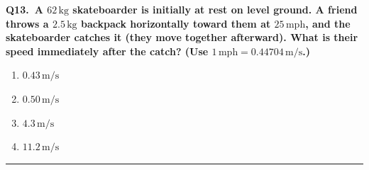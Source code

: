 \documentclass[11pt]{article}
\newcommand{\QuestionStyle}[1]{{\large\bfseries\boldmath #1}}
\newcommand{\AnswerStyle}[1]{{\large\bfseries\boldmath #1}}
\newcommand{\ReasonStyle}[1]{{\normalsize #1}}
\newif\ifshowreason
\newcommand{\Correct}[2]{%
  \item \AnswerStyle{\textcolor{AnsRed}{#1}}%
  \ifshowreason\\[-0.2em]
    \ReasonStyle{\textcolor{AnsRed}{#2}}%
  \fi
}
\newcommand{\Wrong}[2]{%
  \item \AnswerStyle{\textcolor{WrongBlue}{#1}}%
  \ifshowreason\\[-0.2em]
    \ReasonStyle{\textcolor{WrongBlue}{#2}}%
  \fi
}
\newcommand{\QBlock}[3]{%
  \Needspace{8\baselineskip}%
  \noindent
  \begin{minipage}{\linewidth}
    \QuestionStyle{#1.~#2}

    \vspace{0.25em}
    \begin{enumerate}
      #3
    \end{enumerate}

    \vspace{0.25em}
    \hrule height 0.4pt
  \end{minipage}
  \vspace{0.75em}
}
\begin{document}
\QBlock{Q13}{A $62\,\text{kg}$ skateboarder is initially at rest on level ground. A friend throws a $2.5\,\text{kg}$ backpack horizontally toward them at $25\,\text{mph}$, and the skateboarder catches it (they move together afterward). What is their speed immediately after the catch? (Use $1\,\text{mph}=0.44704\,\text{m/s}$.)}{
  \Correct{$0.43\,\text{m/s}$}{Treat the catch as a perfectly inelastic collision and conserve momentum: $m_b v_b = (m_s+m_b)v_f$. Convert $25\,\text{mph}$ to $v_b=25(0.44704)\approx 11.18\,\text{m/s}$, so $v_f=\dfrac{(2.5)(11.18)}{62+2.5}\approx 0.433\,\text{m/s}\approx 0.43\,\text{m/s}$ (verified by calculation).}
  \Wrong{$0.50\,\text{m/s}$}{This is a plausible estimate but comes from rounding too aggressively or using an incorrect combined mass. The misconception is treating approximations as exact without checking the conservation equation carefully.}
  \Wrong{$4.3\,\text{m/s}$}{This often comes from forgetting to divide by the total mass $(m_s+m_b)$. It reflects the mistake of conserving speed rather than momentum.}
  \Wrong{$11.2\,\text{m/s}$}{This is essentially the backpacks speed after unit conversion and ignores the skateboarders much larger mass. The misconception is assuming the heavier person doesnt affect the final velocity in an inelastic catch.}
}
\end{document}
